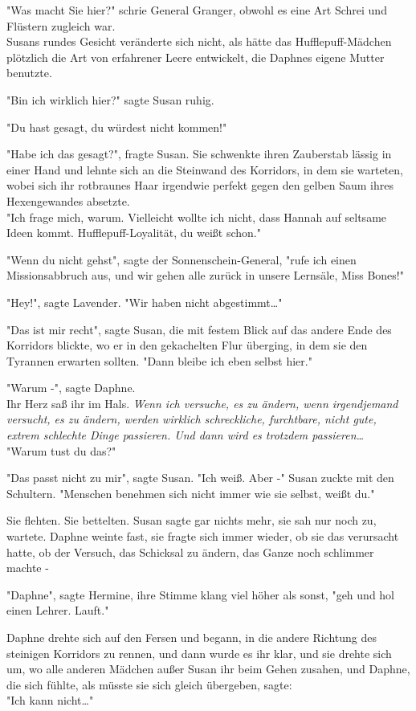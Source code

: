 {"Was macht Sie hier?" schrie General Granger, obwohl es eine Art Schrei und Flüstern zugleich war.\\ Susans rundes Gesicht veränderte sich nicht, als hätte das Hufflepuff-Mädchen plötzlich die Art von erfahrener Leere entwickelt, die Daphnes eigene Mutter benutzte.

"Bin ich wirklich hier?" sagte Susan ruhig.

"Du hast gesagt, du würdest nicht kommen!"

"Habe ich das gesagt?", fragte Susan. Sie schwenkte ihren Zauberstab lässig in einer Hand und lehnte sich an die Steinwand des Korridors, in dem sie warteten, wobei sich ihr rotbraunes Haar irgendwie perfekt gegen den gelben Saum ihres Hexengewandes absetzte.\\ "Ich frage mich, warum. Vielleicht wollte ich nicht, dass Hannah auf seltsame Ideen kommt. Hufflepuff-Loyalität, du weißt schon."

"Wenn du nicht gehst", sagte der Sonnenschein-General, "rufe ich einen Missionsabbruch aus, und wir gehen alle zurück in unsere Lernsäle, Miss Bones!"

"Hey!", sagte Lavender. "Wir haben nicht abgestimmt…"

"Das ist mir recht", sagte Susan, die mit festem Blick auf das andere Ende des Korridors blickte, wo er in den gekachelten Flur überging, in dem sie den Tyrannen erwarten sollten. "Dann bleibe ich eben selbst hier."

"Warum -", sagte Daphne.\\ Ihr Herz saß ihr im Hals. \emph{Wenn ich versuche, es zu ändern, wenn irgendjemand versucht, es zu ändern, werden wirklich schreckliche, furchtbare, nicht gute, extrem schlechte Dinge passieren. Und dann wird es trotzdem passieren…}\\ "Warum tust du das?"

"Das passt nicht zu mir", sagte Susan. "Ich weiß. Aber -" Susan zuckte mit den Schultern. "Menschen benehmen sich nicht immer wie sie selbst, weißt du."

Sie flehten. Sie bettelten. Susan sagte gar nichts mehr, sie sah nur noch zu, wartete. Daphne weinte fast, sie fragte sich immer wieder, ob sie das verursacht hatte, ob der Versuch, das Schicksal zu ändern, das Ganze noch schlimmer machte -

"Daphne", sagte Hermine, ihre Stimme klang viel höher als sonst, "geh und hol einen Lehrer. Lauft."

Daphne drehte sich auf den Fersen und begann, in die andere Richtung des steinigen Korridors zu rennen, und dann wurde es ihr klar, und sie drehte sich um, wo alle anderen Mädchen außer Susan ihr beim Gehen zusahen, und Daphne, die sich fühlte, als müsste sie sich gleich übergeben, sagte:\\ "Ich kann nicht…"

}
